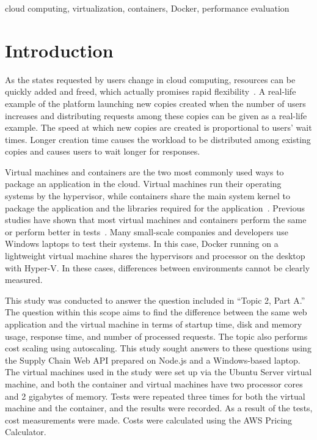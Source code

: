 \documentclass[conference,a4paper]{IEEEtran}
\begin{document}
\begin{IEEEkeywords}
cloud computing, virtualization, containers, Docker, performance evaluation
\end{IEEEkeywords}

\section{Introduction}
\label{sec:introduction}

As the states requested by users change in cloud computing, resources can be quickly added and freed, which actually promises rapid flexibility~\cite{b1}. A real-life example of the platform launching new copies created when the number of users increases and distributing requests among these copies can be given as a real-life example. The speed at which new copies are created is proportional to users' wait times. Longer creation time causes the workload to be distributed among existing copies and causes users to wait longer for responses.

Virtual machines and containers are the two most commonly used ways to package an application in the cloud. Virtual machines run their operating systems by the hypervisor, while containers share the main system kernel to package the application and the libraries required for the application~\cite{b5}. Previous studies have shown that most virtual machines and containers perform the same or perform better in tests~\cite{b6,b7}. Many small-scale companies and developers use Windows laptops to test their systems. In this case, Docker running on a lightweight virtual machine shares the hypervisors and processor on the desktop with Hyper-V. In these cases, differences between environments cannot be clearly measured.

This study was conducted to answer the question included in ``Topic 2, Part A.'' The question within this scope aims to find the difference between the same web application and the virtual machine in terms of startup time, disk and memory usage, response time, and number of processed requests. The topic also performs cost scaling using autoscaling. This study sought answers to these questions using the Supply Chain Web API prepared on Node.js and a Windows-based laptop. The virtual machines used in the study were set up via the Ubuntu Server virtual machine, and both the container and virtual machines have two processor cores and 2 gigabytes of memory. Tests were repeated three times for both the virtual machine and the container, and the results were recorded. As a result of the tests, cost measurements were made. Costs were calculated using the AWS Pricing Calculator.
\end{document}
